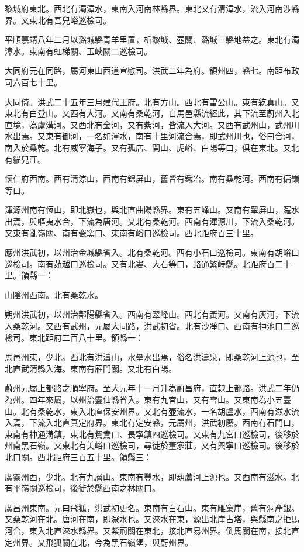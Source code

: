 黎城府東北。西北有濁漳水，東南入河南林縣界。東北又有清漳水，流入河南涉縣界。又東北有吾兒峪巡檢司。

平順嘉靖八年二月以潞城縣青羊里置，析黎城、壺關、潞城三縣地益之。東北有濁漳水。東南有虹梯關、玉峽關二巡檢司。

大同府元在同路，屬河東山西道宣慰司。洪武二年為府。領州四，縣七。南距布政司六百七十里。

大同倚。洪武二十五年三月建代王府。北有方山。西北有雷公山。東有紇真山。又東北有白登山。又西有大河。又南有桑乾河，自馬邑縣流經此，其下流至蔚州入北直境，為盧溝河。又西北有金河，又有紫河，皆流入大河。又西有武州山，武州川水出焉。又東有御河，一名如渾水，南有十里河流合焉，即武州川也，俗曰合河，南入於桑乾。北有威寧海子。又有孤店、開山、虎峪、白陽等口，俱在東北。又北有貓兒莊。

懷仁府西南。西有清涼山，西南有錦屏山，舊皆有鐵冶。南有桑乾河。西南有偏嶺等口。

渾源州南有恆山，即北嶽也，與北直曲陽縣界。東有五峰山。又南有翠屏山，滱水出焉，與嘔夷水合，下流為唐河。又北有桑乾河。西南有渾源川，下流入桑乾河。又東有亂嶺關、南有瓷窯口、東南有峪口巡檢司。西北距府百三十里。

應州洪武初，以州治金城縣省入。北有桑乾河。西有小石口巡檢司。東南有胡峪口巡檢司。南有茹越口巡檢司。又有北婁、大石等口，路通繁峙縣。北距府百二十里。領縣一：

山陰州西南。北有桑乾水。

朔州洪武初，以州治鄯陽縣省入。西南有翠峰山。西北有黃河。又南有灰河，下流入桑乾河。又西有武州，元屬大同路，洪武初省。北有沙凈口、西南有神池口二巡檢司。東北距府二百八十里。領縣一：

馬邑州東，少北。西北有洪濤山，水壘水出焉，俗名洪濤泉，即桑乾河上源也，至北直武清縣入海。東南有雁門關。又北有白陽。

蔚州元屬上都路之順寧府。至大元年十一月升為蔚昌府，直隸上都路。洪武二年仍為州。四年來屬，以州治靈仙縣省入。東有九宮山，又有雪山。又東南為小五臺山。北有桑乾水，東入北直保安州界。又北有壺流水，一名胡盧水，西南有滋水流入焉，下流入北直真定府界。東北有定安縣，元屬州，洪武初廢。西南有石門口，東南有神通溝鎮，東北有鴛鴦口、長寧鎮四巡檢司。又東有九宮口巡檢司，後移於州南黑石嶺。又東北有美峪口巡檢司，尋徙於董家莊。又有興寧口巡檢司。後移於北口關。西北距府三百五十里。領縣三：

廣靈州西，少北。北有九層山。東南有豐水，即葫蘆河上源也。又西南有滋水。北有平嶺關巡檢司，後徙於縣西南之林關口。

廣昌州東南。元曰飛狐，洪武初更名。東南有白石山。東有雕窠崖，舊有洞產銀。又桑乾河在北。唐河在南，即滱水也。又淶水在東，源出北崖古塔，與縣南之拒馬河合，東入北直淶水縣界。又紫荊關在東北，接北直易州界。倒馬關在南，接北直定州界。又飛狐關在北，今為黑石嶺堡，與蔚州界。


